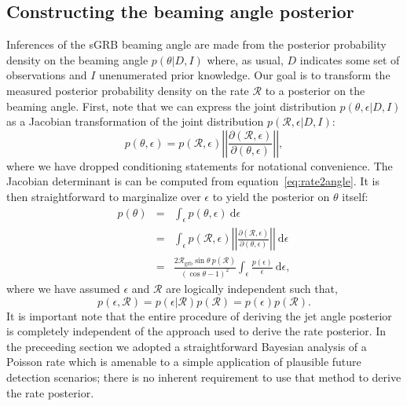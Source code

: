 \documentclass[twocolumn,nofootinbib]{revtex4-1}
\newcommand{\grbrate}{{{\mathcal R}_{\mathrm{grb}}}}
\newcommand{\cbcrate}{{{\mathcal R}}}
\newcommand{\diff}{{\mathrm d}}
\begin{document}
\subsection{Constructing the beaming angle posterior}
Inferences of the \ac{sGRB} beaming angle are made from the posterior probability density on the beaming angle $p(\theta|D,I)$ where, as usual, $D$ indicates some set of observations and $I$ unenumerated prior knowledge.
Our goal is to transform the measured posterior probability density on the rate $\cbcrate$ to a posterior on the beaming angle.
%
First, note that we can express the joint distribution $p(\theta, \epsilon|D,I)$ as a Jacobian transformation of the joint distribution $p(\cbcrate,
\epsilon|D,I)$:
\begin{equation}
p(\theta,\epsilon) = p(\cbcrate,\epsilon)
\left\lvert\left\lvert
\frac{\partial(\cbcrate,\epsilon)}{\partial(\theta,\epsilon)}
\right\rvert\right\rvert,
\end{equation}
%
where we have dropped conditioning statements for notational convenience.
The Jacobian determinant is can be  computed from equation~\ref{eq:rate2angle}.
It is then straightforward to marginalize over $\epsilon$ to yield the posterior on $\theta$ itself:
%
\begin{eqnarray}
    \label{eq:beam_posterior}
    p(\theta) & = & \int_{\epsilon} p(\theta,\epsilon)~\diff \epsilon\\
              & = & \int_{\epsilon} p(\cbcrate,\epsilon)
    \left\lvert\left\lvert
    \frac{\partial(\cbcrate,\epsilon)}{\partial(\theta,\epsilon)}
    \right\rvert\right\rvert~\diff \epsilon \\
              & = & \frac{2\grbrate \sin
\theta~p(\cbcrate)}{(\cos\theta-1)^2}\int_{\epsilon}
\frac{p(\epsilon)}{\epsilon} ~\diff \epsilon,
\end{eqnarray}
%
where we have assumed $\epsilon$ and $\cbcrate$ are logically independent such that,
\begin{equation}
p(\epsilon,\cbcrate) = p(\epsilon|\cbcrate)p(\cbcrate) = p(\epsilon)p(\cbcrate).
\end{equation}
%
It is important note that the entire procedure of deriving the jet angle posterior is completely independent of the approach used to derive the rate posterior.
In the preceeding section we adopted a straightforward Bayesian analysis of a Poisson rate which is amenable to a simple application of plausible future detection scenarios; there is no inherent requirement to use that method to derive the rate posterior.
\end{document}
